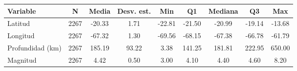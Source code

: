 \begin{tabular}{lcccccccc}
\toprule
Variable & N & Media & Desv. est. & Min & Q1 & Mediana & Q3 & Max \\
\midrule
Latitud & 2267 & -20.33 & 1.71 & -22.81 & -21.50 & -20.99 & -19.14 & -13.68 \\
Longitud & 2267 & -67.32 & 1.30 & -69.56 & -68.15 & -67.38 & -66.78 & -61.79 \\
Profundidad (km) & 2267 & 185.19 & 93.22 & 3.38 & 141.25 & 181.81 & 222.95 & 650.00 \\
Magnitud & 2267 & 4.42 & 0.50 & 3.00 & 4.10 & 4.40 & 4.60 & 8.20 \\
\bottomrule
\end{tabular}